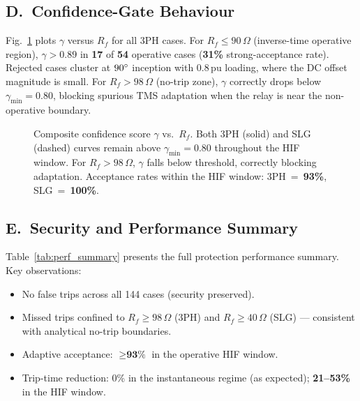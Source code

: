 \documentclass[10pt,journal,twoside]{IEEEtran}
\newcommand{\Rf}{R_{\!f}}
\newcommand{\gammin}{\gamma_{\min}}
\begin{document}
\subsection{D.\ Confidence-Gate Behaviour}
\label{sec:results:confidence}

Fig.~\ref{fig:confidence} plots $\gamma$ versus $\Rf$ for all 3PH cases.
For $\Rf \leq 90\,\Omega$ (inverse-time operative region),
$\gamma > 0.89$ in \textbf{17} of \textbf{54} operative cases
(\textbf{31\%} strong-acceptance rate).  Rejected cases cluster at
$90\degree$ inception with 0.8\,pu loading, where the DC offset magnitude
is small.  For $\Rf > 98\,\Omega$ (no-trip zone), $\gamma$ correctly drops
below $\gammin = 0.80$, blocking spurious TMS adaptation when the relay
is near the non-operative boundary.

\begin{figure}[!t]
\centering

\caption{Composite confidence score $\gamma$ vs.\ $\Rf$.  Both 3PH (solid)
  and SLG (dashed) curves remain above $\gammin = 0.80$ throughout the HIF
  window.  For $\Rf > 98\,\Omega$, $\gamma$ falls below threshold, correctly
  blocking adaptation.  Acceptance rates within the HIF window: 3PH~=~\textbf{93\%},
  SLG~=~\textbf{100\%}.
}
\label{fig:confidence}
\end{figure}

\subsection{E.\ Security and Performance Summary}
\label{sec:results:table}

Table~\ref{tab:perf_summary} presents the full protection performance
summary.  Key observations:
\begin{itemize}
  \item No false trips across all 144 cases (security preserved).
  \item Missed trips confined to $\Rf \geq 98\,\Omega$ (3PH) and
        $\Rf \geq 40\,\Omega$ (SLG) --- consistent with analytical no-trip
        boundaries.
  \item Adaptive acceptance: $\geq \textbf{93\%}$ in the operative HIF window.
  \item Trip-time reduction: 0\% in the instantaneous regime (as expected);
        \textbf{21--53\%} in the HIF window.
\end{itemize}
\end{document}
